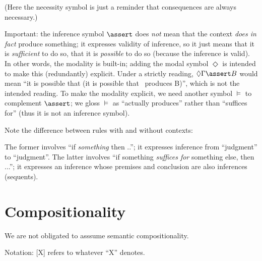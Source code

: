 \documentclass{article}
\begin{document}

(Here the necessity symbol is just a reminder that consequences are
always necessary.)

Important: the inference symbol \(\linfer\) does \textit{not} mean that
the context \textit{does in fact} produce something; it expresses
validity of inference, so it just means that it is \textit{sufficient}
to do so, that it is \textit{possible} to do so (because the inference
is valid). In other words, the modality is built-in; adding the modal
symbol \(\Diamond\) is intended to make this (redundantly) explicit.
Under a strictly reading, \(\Diamond\Gamma\linfer B\) would mean ``it
is possible that (it is possible that \Gamma\ produces B)'', which is
not the intended reading. To make the modality explicit, we need
another symbol \(\models\) to complement \(\linfer\); we gloss
\(\models\) as ``actually produces'' rather than ``suffices for''
(thus it is not an inference symbol).

Note the difference between rules with and without contexts:



The former involves ``if \textit{something} then ..''; it expresses
inference from ``judgment'' to ``judgment''. The latter involves ``if
something \textit{suffices for} something else, then ...''; it
expresses an inference whose premises and conclusion are also
inferences (sequents).

\section{Compositionality}

We are not obligated to asssume semantic compositionality.

Notation:  [X] refers to whatever ``X'' denotes.
\end{document}
